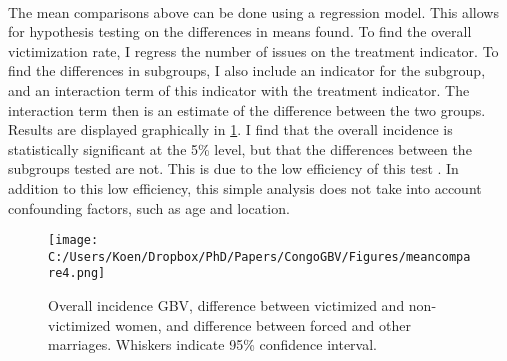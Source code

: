 \documentclass[11pt,a4paper]{scrartcl} %
\begin{document}
\paragraph{}
The mean comparisons above can be done using a regression model. This allows for hypothesis testing on the differences in means found. To find the overall victimization rate, I regress the number of issues on the treatment indicator. To find the differences in subgroups, I also include an indicator for the subgroup, and an interaction term of this indicator with the treatment indicator. The interaction term then is an estimate of the difference between the two groups. Results are displayed graphically in \ref{fig:meancompare4}. I find that the overall incidence is statistically significant at the 5\% level, but that the differences between the subgroups tested are not. This is due to the low efficiency of this test \cite{Imai2011}. In addition to this low efficiency, this simple analysis does not take into account confounding factors, such as age and location.

\begin{figure}
  \texttt{[image: C:/Users/Koen/Dropbox/PhD/Papers/CongoGBV/Figures/meancompare4.png]}
  \caption{Overall incidence GBV, difference between victimized and non-victimized women, and difference between forced and other marriages. Whiskers indicate 95\% confidence interval.}
  \label{fig:meancompare4}
\end{figure}

\end{document}
